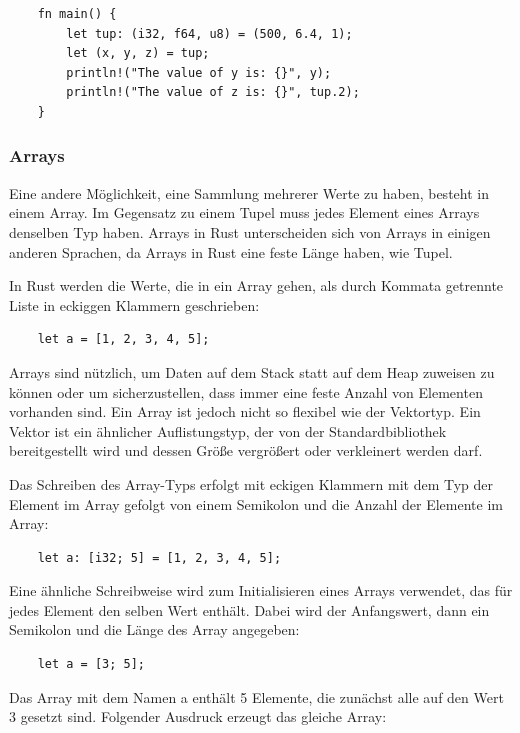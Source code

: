 \begin{lstlisting}
    fn main() {
        let tup: (i32, f64, u8) = (500, 6.4, 1);
        let (x, y, z) = tup;
        println!("The value of y is: {}", y);
        println!("The value of z is: {}", tup.2);
    }
\end{lstlisting}

\subsubsection{Arrays}

Eine andere Möglichkeit, eine Sammlung mehrerer Werte zu haben, besteht in einem Array. Im Gegensatz zu einem Tupel muss jedes Element eines Arrays denselben Typ haben. Arrays in Rust unterscheiden sich von Arrays in einigen anderen Sprachen, da Arrays in Rust eine feste Länge haben, wie Tupel.

In Rust werden die Werte, die in ein Array gehen, als durch Kommata getrennte Liste in eckiggen Klammern geschrieben:

\begin{lstlisting}
    let a = [1, 2, 3, 4, 5];
\end{lstlisting}

Arrays sind nützlich, um Daten auf dem Stack statt auf dem Heap zuweisen zu können oder um sicherzustellen, dass immer eine feste Anzahl von Elementen vorhanden sind. Ein Array ist jedoch nicht so flexibel wie der Vektortyp. Ein Vektor ist ein ähnlicher Auflistungstyp, der von der Standardbibliothek bereitgestellt wird und dessen Größe vergrößert oder verkleinert werden darf.

Das Schreiben des Array-Typs erfolgt mit eckigen Klammern mit dem Typ der Element im Array gefolgt von einem Semikolon und die Anzahl der Elemente im Array:

\begin{lstlisting}
    let a: [i32; 5] = [1, 2, 3, 4, 5];
\end{lstlisting}

Eine ähnliche Schreibweise wird zum Initialisieren eines Arrays verwendet, das für jedes Element den selben Wert enthält. Dabei wird der Anfangswert, dann ein Semikolon und die Länge des Array angegeben:

\begin{lstlisting}
    let a = [3; 5];
\end{lstlisting}

Das Array mit dem Namen \glqq a\grqq{} enthält 5 Elemente, die zunächst alle auf den Wert 3 gesetzt sind. Folgender Ausdruck erzeugt das gleiche Array:

